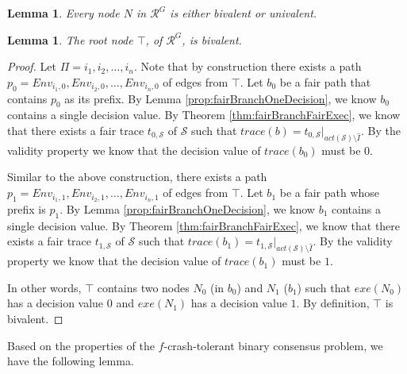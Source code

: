 \documentclass[11pt]{article}
\numberwithin{theorem}{section}
\newtheorem{lemma}[theorem]{Lemma}
\begin{document}
\begin{lemma}\label{prop:everyNodeIsBiOrUnivalent}
 Every node $N$ in $\mathcal{R}^G$ is either bivalent or univalent.
\end{lemma}








\begin{lemma}\label{prop:initialBivalent}
 The root node $\top$, of $\mathcal{R}^G$, is bivalent.
\end{lemma}
\begin{proof}
Let $\Pi = {i_1,i_2,\ldots,i_n}$.
Note that by construction there exists a path $p_0 = Env_{i_1,0},Env_{i_2,0},\ldots,Env_{i_n,0}$ of edges from $\top$. Let $b_0$ be a fair path that contains $p_0$ as its prefix. By Lemma \ref{prop:fairBranchOneDecision}, we know $b_0$ contains a single decision value. By Theorem \ref{thm:fairBranchFairExec}, we know that there exists a fair trace $t_{0,\mathcal{S}}$ of $\mathcal{S}$ such that  $trace(b) = t_{0,\mathcal{S}}|_{act(\mathcal{S}) \setminus \hat{I}}$. By the validity property we know that the decision value of $trace(b_0)$ must be $0$.

Similar to the above construction, there exists a path $p_1 = Env_{i_1,1},Env_{i_2,1},\ldots,Env_{i_n,1}$ of edges from $\top$. Let $b_1$ be a fair path whose prefix is $p_1$. By Lemma \ref{prop:fairBranchOneDecision}, we know $b_1$ contains a single decision value. By Theorem \ref{thm:fairBranchFairExec}, we know that there exists a fair trace $t_{1,\mathcal{S}}$ of $\mathcal{S}$ such that  $trace(b_1) = t_{1,\mathcal{S}}|_{act(\mathcal{S}) \setminus \hat{I}}$. By the validity property we know that the decision value of $trace(b_1)$ must be $1$.

In other words, $\top$ contains two nodes $N_0$ (in $b_0$) and $N_1$ ($b_1$) such that $exe(N_0)$ has a decision value $0$ and $exe(N_1)$ has a decision value $1$. By definition, $\top$ is bivalent.
\end{proof}
Based on the properties of the $f$-crash-tolerant binary consensus
problem, we have the following lemma.
\end{document}
